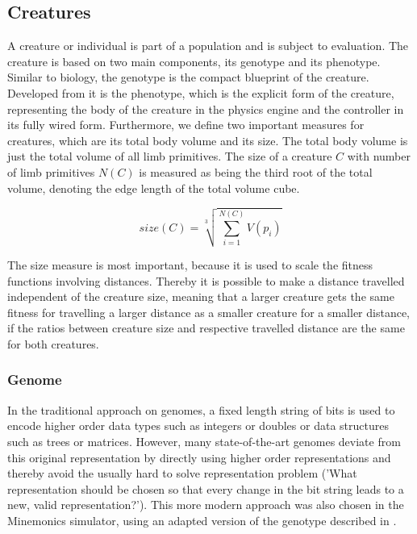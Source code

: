 \documentclass[main]{subfiles}
\begin{document}
\subsection{Creatures}
\label{subsec:creatures}

A creature or individual is part of a population and is subject to evaluation. %
%
The creature is based on two main components, its genotype and its phenotype. %
%
Similar to biology, the genotype is the compact blueprint of the creature. %
%
Developed from it is the phenotype, which is the explicit form of the creature, representing the body of the creature in the physics engine and the controller in its fully wired form. %
%
Furthermore, we define two important measures for creatures, which are its total body volume and its size. %
%
The total body volume is just the total volume of all limb primitives. %
%
The size of a creature \(C\) with number of limb primitives \(N(C)\) is measured as being the third root of the total volume, denoting the edge length of the total volume cube. 

\begin{equation}
size(C) = \sqrt[3]{\sum\limits^{N(C)}_{i=1} V(p_i)}
\label{eqn:body-cube-root-length}
\end{equation}

The size measure is most important, because it is used to scale the fitness functions involving distances. %
%
Thereby it is possible to make a distance travelled independent of the creature size, meaning that a larger creature gets the same fitness for travelling a larger distance as a smaller creature for a smaller distance, if the ratios between creature size and respective travelled distance are the same for both creatures.

\subsubsection{Genome}

In the traditional approach on genomes, a fixed length string of bits is used to encode higher order data types such as integers or doubles or data structures such as trees or matrices. %
%
However, many state-of-the-art genomes deviate from this original representation by directly using higher order representations and thereby avoid the usually hard to solve representation problem ('What representation should be chosen so that every change in the bit string leads to a new, valid representation?'). %
%
This more modern approach was also chosen in the Minemonics simulator, using an adapted version of the genotype described in \cite{bib:Graham2009}.
\end{document}
